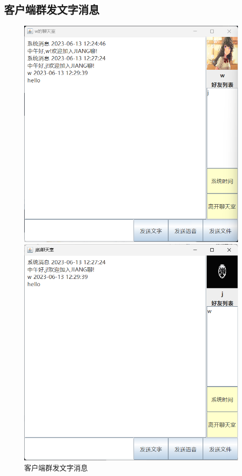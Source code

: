 \documentclass[UTF8,12pt]{article}
\begin{document}
\newpage

\subsection{客户端群发文字消息}
\begin{figure}[htbp]
    \centering
    \begin{minipage}{0.4\textwidth}
        \centering
        \includegraphics[width=1.0\textwidth]{img/15.png}
    \end{minipage}
    \begin{minipage}{0.4\textwidth}
        \centering
        \includegraphics[width=1.0\textwidth]{img/16.png}
    \end{minipage}
    \caption{客户端群发文字消息}
\end{figure}
\end{document}
